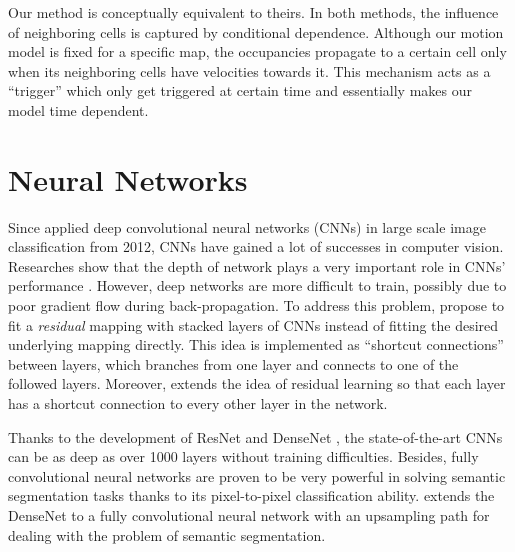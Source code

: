 Our method is conceptually equivalent to theirs. In both methods, the influence of neighboring cells is captured by conditional dependence. Although our motion model is fixed for a specific map, the occupancies propagate to a certain cell only when its neighboring cells have velocities towards it. This mechanism acts as a ``trigger'' which only get triggered at certain time and essentially makes our model time dependent.


\section{Neural Networks} \label{lr:network}

Since \citet{krizhevsky2012imagenet} applied deep convolutional neural networks (CNNs) in large scale image classification from 2012, CNNs have gained a lot of successes in computer vision. Researches show that the depth of network plays a very important role in CNNs' performance \citep{simonyan2014very}. However, deep networks are more difficult to train, possibly due to poor gradient flow during back-propagation. To address this problem, \citet{he2016deep} propose to fit a \textit{residual} mapping with stacked layers of CNNs instead of fitting the desired underlying mapping directly. This idea is implemented as ``shortcut connections'' between layers, which branches from one layer and connects to one of the followed layers. Moreover, \citep{huang2016densely} extends the idea of residual learning so that each layer has a shortcut connection to every other layer in the network. 

Thanks to the development of ResNet \citep{he2016deep} and DenseNet \citep{huang2016densely}, the state-of-the-art CNNs can be as deep as over 1000 layers without training difficulties. Besides, fully convolutional neural networks \citep{long2015fully} are proven to be very powerful in solving semantic segmentation tasks thanks to its pixel-to-pixel classification ability. \citet{jegou2017one} extends the DenseNet to a fully convolutional neural network with an upsampling path for dealing with the problem of semantic segmentation. 

